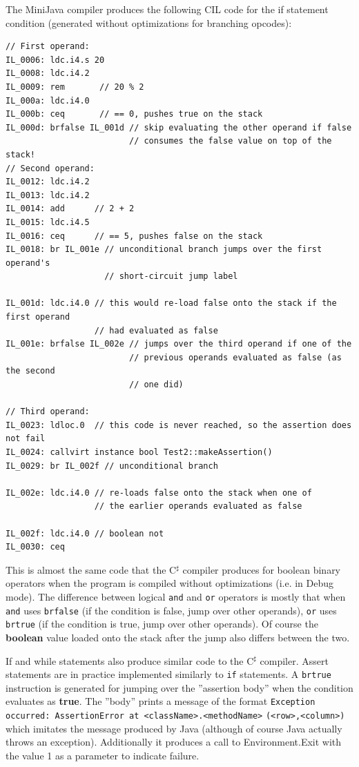 \documentclass[a4paper,11pt]{article}
\begin{document}
The MiniJava compiler produces the following CIL code for the if statement condition (generated without optimizations for branching opcodes):
\begin{verbatim}
// First operand:
IL_0006: ldc.i4.s 20
IL_0008: ldc.i4.2
IL_0009: rem       // 20 % 2
IL_000a: ldc.i4.0
IL_000b: ceq       // == 0, pushes true on the stack
IL_000d: brfalse IL_001d // skip evaluating the other operand if false
                         // consumes the false value on top of the stack!
// Second operand:
IL_0012: ldc.i4.2
IL_0013: ldc.i4.2
IL_0014: add      // 2 + 2
IL_0015: ldc.i4.5
IL_0016: ceq      // == 5, pushes false on the stack
IL_0018: br IL_001e // unconditional branch jumps over the first operand's
                    // short-circuit jump label

IL_001d: ldc.i4.0 // this would re-load false onto the stack if the first operand
                  // had evaluated as false
IL_001e: brfalse IL_002e // jumps over the third operand if one of the
                         // previous operands evaluated as false (as the second
                         // one did)

// Third operand:
IL_0023: ldloc.0  // this code is never reached, so the assertion does not fail
IL_0024: callvirt instance bool Test2::makeAssertion()
IL_0029: br IL_002f // unconditional branch

IL_002e: ldc.i4.0 // re-loads false onto the stack when one of
                  // the earlier operands evaluated as false

IL_002f: ldc.i4.0 // boolean not
IL_0030: ceq
\end{verbatim}

This is almost the same code that the C$^\sharp$ compiler produces for boolean binary operators when the program is compiled without optimizations (i.e. in Debug mode). The difference between logical \verb,and, and \verb,or, operators is mostly that when \verb,and, uses \verb,brfalse, (if the condition is false, jump over other operands), \verb,or, uses \verb,brtrue, (if the condition is true, jump over other operands). Of course the \textbf{boolean} value loaded onto the stack after the jump also differs between the two.

If and while statements also produce similar code to the C$^\sharp$ compiler. Assert statements are in practice implemented similarly to \verb,if, statements. A \verb,brtrue, instruction is generated for jumping over the ''assertion body'' when the condition evaluates as \textbf{true}. The ''body'' prints a message of the format \verb|Exception occurred: AssertionError at <className>.<methodName>| \verb|(<row>,<column>)| which imitates the message produced by Java (although of course Java actually throws an exception). Additionally it produces a call to Environment.Exit with the value 1 as a parameter to indicate failure.
\end{document}
